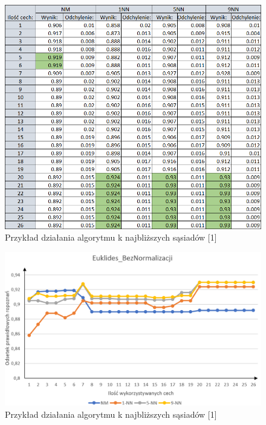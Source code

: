 \documentclass[12pt]{article}
\begin{document}
\begin{figure}[H]
	\centering
		\includegraphics[scale=0.8]{images/algorithms/euklides_beznorm_tab.png}
	\caption{Przykład działania algorytmu k najbliższych sąsiadów [1]}
\end{figure}
\begin{figure}[H]
	\centering
		\includegraphics[scale=0.66]{images/algorithms/euklides_beznorm.png}
	\caption{Przykład działania algorytmu k najbliższych sąsiadów [1]}
\end{figure}
\end{document}

